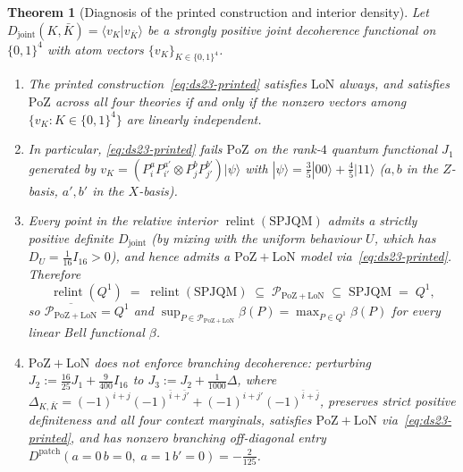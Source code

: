\documentclass[11pt,a4paper]{article}
\newtheorem{theorem}{Theorem}[section]
\theoremstyle{definition}
\theoremstyle{remark}
\newcommand{\SPJQM}{\mathrm{SPJQM}}
\newcommand{\Qone}{Q^{1}}
\newcommand{\PoZ}{\mathrm{PoZ}}
\newcommand{\LoN}{\mathrm{LoN}}
\newcommand{\PPoZ}{\mathcal{P}_{\PoZ+\LoN}}
\newcommand{\ket}[1]{|#1\rangle}
\newcommand{\braket}[2]{\langle #1 | #2 \rangle}
\newcommand{\relint}{\operatorname{relint}}
\begin{document}
\begin{theorem}[Diagnosis of the printed construction and interior density]
\label{thm:ds23-printed}
Let $D_{\mathrm{joint}}(K, \bar{K}) = \braket{v_K}{v_{\bar{K}}}$ be a strongly positive joint decoherence functional on $\{0,1\}^4$ with atom vectors $\{v_K\}_{K \in \{0,1\}^4}$.
\begin{enumerate}[label=(\alph*),nosep]
\item The printed construction~\eqref{eq:ds23-printed} satisfies $\LoN$ always, and satisfies $\PoZ$ across all four theories if and only if the nonzero vectors among $\{v_K : K \in \{0,1\}^4\}$ are linearly independent.
\item In particular, \eqref{eq:ds23-printed} fails $\PoZ$ on the rank-$4$ quantum functional $J_1$ generated by $v_K = (P^a_i P^{a'}_{i'} \otimes P^b_j P^{b'}_{j'})\ket{\psi}$ with $\ket{\psi} = \tfrac{3}{5}\ket{00}+\tfrac{4}{5}\ket{11}$ ($a,b$ in the $Z$-basis, $a',b'$ in the $X$-basis).
\item Every point in the relative interior $\relint(\SPJQM)$ admits a strictly positive definite $D_{\mathrm{joint}}$ (by mixing with the uniform behaviour $U$, which has $D_U = \tfrac{1}{16} I_{16} > 0$), and hence admits a $\PoZ+\LoN$ model via~\eqref{eq:ds23-printed}. Therefore
\begin{equation}\label{eq:relint-sandwich}
\relint(\Qone) \;=\; \relint(\SPJQM) \;\subseteq\; \PPoZ \;\subseteq\; \SPJQM \;=\; \Qone,
\end{equation}
so $\overline{\PPoZ} = \Qone$ and $\sup_{P \in \PPoZ} \beta(P) = \max_{P \in \Qone} \beta(P)$ for every linear Bell functional $\beta$.
\item $\PoZ + \LoN$ does not enforce branching decoherence: perturbing $J_2 := \tfrac{16}{25} J_1 + \tfrac{9}{400} I_{16}$ to $J_3 := J_2 + \tfrac{1}{1000}\Delta$, where $\Delta_{K,\bar{K}} = (-1)^{i+j}(-1)^{\bar{i}+\bar{j}'} + (-1)^{i+j'}(-1)^{\bar{i}+\bar{j}}$, preserves strict positive definiteness and all four context marginals, satisfies $\PoZ+\LoN$ via~\eqref{eq:ds23-printed}, and has nonzero branching off-diagonal entry $D^{\mathrm{patch}}(a{=}0\,b{=}0,\; a{=}1\,b'{=}0) = -\tfrac{2}{125}$.
\end{enumerate}
\end{theorem}
\end{document}
